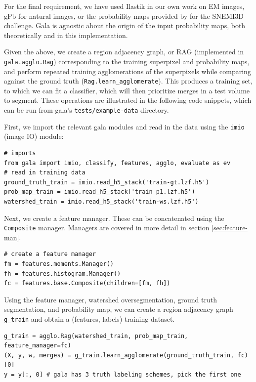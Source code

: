 \documentclass{frontiersSCNS} %
\begin{document}
For the final requirement, we have used Ilastik \citep{ilastik} in our own work on EM images, gPb \citep{globalpb} for natural images, or the probability maps provided by \cite{Ciresan:2012vi} for the SNEMI3D challenge.
Gala is agnostic about the origin of the input probability maps, both theoretically and in this implementation.

Given the above, we create a region adjacency graph, or RAG (implemented in \texttt{\small gala.agglo.Rag}) corresponding to the training superpixel and probability maps, and perform repeated training agglomerations of the superpixels while comparing against the ground truth (\texttt{\small Rag.learn\_agglomerate}).
This produces a training set, to which we can fit a classifier, which will then prioritize merges in a test volume to segment.
These operations are illustrated in the following code snippets, which can be run from gala's \texttt{\small tests/example-data} directory.

First, we import the relevant gala modules and read in the data using the \texttt{\small imio} (image IO) module:

{\small
\begin{verbatim}
# imports
from gala import imio, classify, features, agglo, evaluate as ev
# read in training data
ground_truth_train = imio.read_h5_stack('train-gt.lzf.h5')
prob_map_train = imio.read_h5_stack('train-p1.lzf.h5')
watershed_train = imio.read_h5_stack('train-ws.lzf.h5')
\end{verbatim}
}

Next, we create a feature manager.
These can be concatenated using the \texttt{\small Composite} manager.
Managers are covered in more detail in section \ref{sec:feature-man}.

{\small
\begin{verbatim}
# create a feature manager
fm = features.moments.Manager()
fh = features.histogram.Manager()
fc = features.base.Composite(children=[fm, fh])
\end{verbatim}
}

Using the feature manager, watershed oversegmentation, ground truth segmentation, and probability map, we can create a region adjacency graph \texttt{\small g\_train} and obtain a (features, labels) training dataset.

{\small
\begin{verbatim}
g_train = agglo.Rag(watershed_train, prob_map_train, feature_manager=fc)
(X, y, w, merges) = g_train.learn_agglomerate(ground_truth_train, fc)[0]
y = y[:, 0] # gala has 3 truth labeling schemes, pick the first one
\end{verbatim}
}
\end{document}
